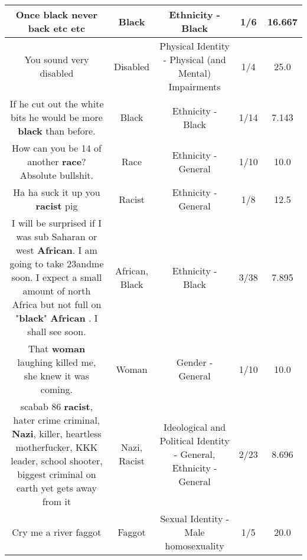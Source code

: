 \documentclass[11pt]{article}
\newlength\mylength
\begin{document}
\begin{center}
\begin{longtable}{|C{.65\mylength}|C{.30\mylength}|C{.12\mylength}|C{.12\mylength}|C{.12\mylength}|}
  \small Once \textbf{black} never back etc etc\normalsize   & Black & Ethnicity - Black & 1/6 & 16.667 \\  \hline
  \small You sound very disabled\normalsize   & Disabled & Physical Identity - Physical (and Mental) Impairments & 1/4 & 25.0 \\  \hline
  \small If he cut out the white bits he would be more \textbf{black} than before.\normalsize   & Black & Ethnicity - Black & 1/14 & 7.143 \\  \hline
  \small How can you be 14 of another \textbf{race}? Absolute bullshit.\normalsize   & Race & Ethnicity - General & 1/10 & 10.0 \\  \hline
  \small Ha ha suck it up  you \textbf{racist}  pig\normalsize   & Racist & Ethnicity - General & 1/8 & 12.5 \\  \hline
  \small I will be surprised if I was sub Saharan or west \textbf{African}. I am going to take 23andme soon. I expect a small amount of north Africa but not full on "\textbf{black}" \textbf{African} . I shall see soon.\normalsize   & African, Black & Ethnicity - Black & 3/38 & 7.895 \\  \hline
  \small That \textbf{woman} laughing killed me, she knew it was coming.\normalsize   & Woman & Gender - General & 1/10 & 10.0 \\  \hline
  \small scabab 86 \textbf{racist}, hater crime criminal, \textbf{Nazi}, killer, heartless motherfucker, KKK leader, school shooter, biggest criminal on earth yet gets away from it\normalsize   & Nazi, Racist &  Ideological and Political Identity - General, Ethnicity - General & 2/23 & 8.696 \\  \hline
  \small Cry me a river faggot\normalsize   & Faggot & Sexual Identity - Male homosexuality & 1/5 & 20.0 \\  \hline

\end{longtable}
\end{center}
\end{document}
